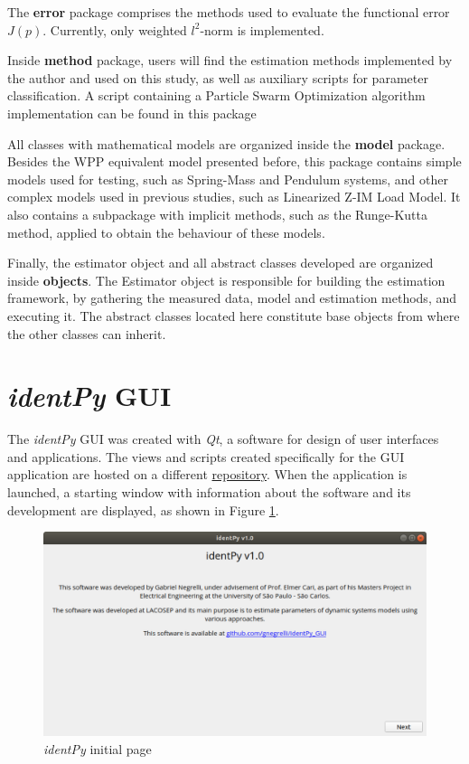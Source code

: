 The \textbf{error} package comprises the methods used to evaluate the functional error $J(p)$. Currently, only weighted $l^{2}$-norm is implemented.

Inside \textbf{method} package, users will find the estimation methods implemented by the author and used on this study, as well as auxiliary scripts for parameter classification. A script containing a Particle Swarm Optimization algorithm implementation can be found in this package

All classes with mathematical models are organized inside the \textbf{model} package. Besides the WPP equivalent model presented before, this package contains simple models used for testing, such as Spring-Mass and Pendulum systems, and other complex models used in previous studies, such as Linearized Z-IM Load Model. It also contains a subpackage with implicit methods, such as the Runge-Kutta method, applied to obtain the behaviour of these models.

Finally, the estimator object and all abstract classes developed are organized inside \textbf{objects}. The Estimator object is responsible for building the estimation framework, by gathering the measured data, model and estimation methods, and executing it. The abstract classes located here constitute base objects from where the other classes can inherit.

\section{\textit{identPy} GUI}

The \textit{identPy} GUI was created with \textit{Qt}, a software for design of user interfaces and applications. The views and scripts created specifically for the GUI application are hosted on a different \href{https://github.com/gnegrelli/identPy_GUI}{repository}. When the application is launched, a starting window with information about the software and its development are displayed, as shown in Figure \ref{fig: initial_page}.

\begin{figure}[!h]
	\caption{\textit{identPy} initial page}
	\begin{center}
		\includegraphics[scale=.5]{Images/Software_initial_page.eps}
	\end{center}
	\label{fig: initial_page}
\end{figure}

